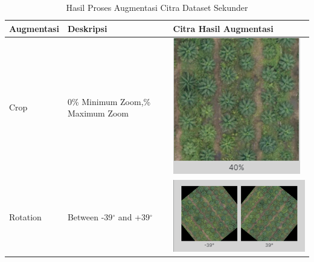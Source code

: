 \begin{singlespace}
	\begin{table}[H]
		\centering
		\caption{Hasil Proses Augmentasi Citra Dataset Sekunder}
		\label{tbl:Hasil-Proses-Augmentasi-Citra-Dataset-Sekunder}
		\begin{tabular}{|m{3cm}|m{3cm}|m{6cm}|}
			\hline
			\rowcolor[HTML]{D9D9D9} 
			Augmentasi & Deskripsi                                                                & Citra Hasil Augmentasi \\ \hline
			
			
			Crop & 0\% Minimum Zoom,\newline 40\% Maximum Zoom & \includegraphics[width=0.4\columnwidth]{bab4/Gambar/tbl-5-pic1.png}\\ \hline
			
			Rotation & Between -39$^{\circ}$ and +39$^{\circ}$ & \includegraphics[width=0.4\columnwidth]{bab4/Gambar/tbl-5-pic2.png}\\ \hline
		\end{tabular}
	\end{table}
\end{singlespace}

